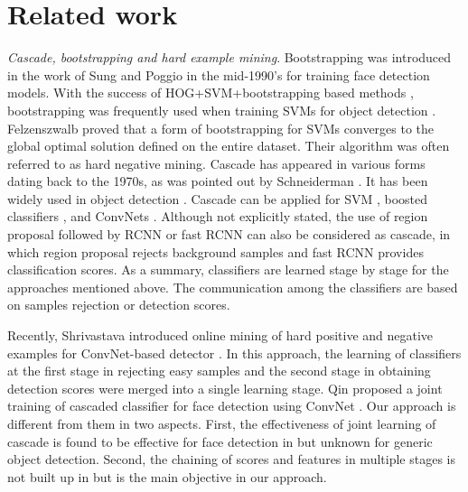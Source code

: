 \documentclass[10pt,twocolumn,letterpaper]{article}
\begin{document}
\section{Related work}
\emph{Cascade, bootstrapping and hard example mining}. Bootstrapping was introduced in the work of Sung
and Poggio \cite{sung1996learning} in the mid-1990’s for training face detection models. With the success of HOG+SVM+bootstrapping based methods \cite{Dalal:HOG, LatSVMObj}, bootstrapping was frequently
used when training SVMs for object detection \cite{girshick2014rich}. Felzenszwalb \etal \cite{LatSVMObj} proved that a form of bootstrapping
for SVMs converges to the global optimal solution defined on the entire dataset. Their algorithm was often
referred to as hard negative mining.
Cascade has appeared in various forms dating back to the 1970s, as was pointed out by Schneiderman \cite{schneiderman2004feature}.
It has been widely used in object detection \cite{Pedersoli:C2FObj2, Felzenszwalb:cascade10,bourdev2005robust,dollar2014fast,li2004floatboost}. Cascade can be applied for SVM \cite{Pedersoli:C2FObj2, Felzenszwalb:cascade10}, boosted classifiers \cite{dollar2014fast,li2004floatboost,xiao2003boosting}, and ConvNets \cite{yang2016craft}. Although not explicitly stated, the use of region proposal followed by RCNN or fast RCNN can also be considered as cascade, in which region proposal rejects background samples and fast RCNN provides classification scores. As a summary,  classifiers are learned stage by stage for the approaches mentioned above. The communication among the classifiers are based on samples rejection or detection scores.

 Recently, Shrivastava \etal introduced online mining of hard positive and negative examples for ConvNet-based detector \cite{shrivastava2016training} . In this approach, the learning of classifiers at the first stage in rejecting easy samples and the second stage in obtaining detection scores were merged into a single learning stage.  
Qin \etal proposed a joint training of cascaded classifier for face detection using ConvNet \cite{qin2016joint}. Our approach is different from them in two aspects. First, the effectiveness of joint learning of cascade is found to be effective for face detection in \cite{qin2016joint} but unknown for generic object detection. Second, the chaining of scores and features in multiple stages is not built up in \cite{qin2016joint, shrivastava2016training} but is the main objective in our approach.
\end{document}
